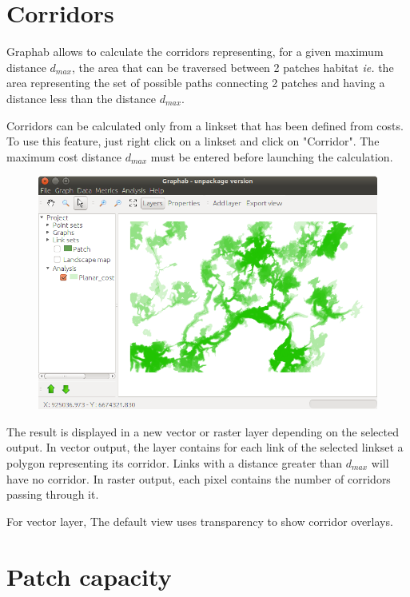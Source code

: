 \documentclass{article}
\begin{document}
\section{Corridors}

Graphab allows to calculate the corridors representing, for a given maximum distance $d_{max}$, the area that can be traversed between 2 patches habitat \textit{ie.} the area representing the set of possible paths connecting 2 patches and having a distance less than the distance $d_{max}$.

Corridors can be calculated only from a linkset that has been defined from costs. To use this feature, just right click on a linkset and click on "Corridor".
The maximum cost distance $d_{max}$ must be entered before launching the calculation.	

\begin{figure}[H]
	\includegraphics[scale=0.5]{img/manual-en_corridor.png} 
\end{figure}

The result is displayed in a new vector or raster layer depending on the selected output. In vector output, the layer contains for each link of the selected linkset a polygon representing its corridor. Links with a distance greater than $d_{max}$ will have no corridor.
In raster output, each pixel contains the number of corridors passing through it.

For vector layer, The default view uses transparency to show corridor overlays.


\section{Patch capacity}
\end{document}
